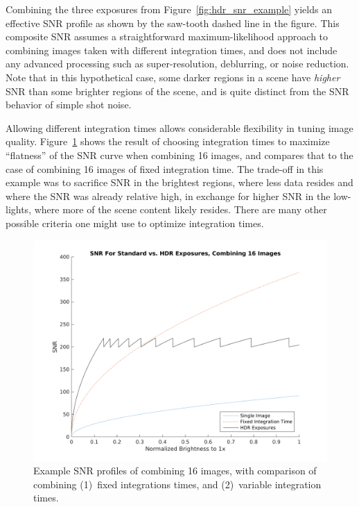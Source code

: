 \documentclass[10pt,journal]{IEEEtran}  %
\begin{document}
Combining the three exposures from Figure~\ref{fig:hdr_snr_example} yields an effective SNR profile as shown by the saw-tooth dashed line in the figure. This composite SNR assumes a straightforward maximum-likelihood approach to combining images taken with different integration times, and does not include any advanced processing such as super-resolution, deblurring, or noise reduction. Note that in this hypothetical case, some darker regions in a scene have \emph{higher} SNR than some brighter regions of the scene, and is quite distinct from the SNR behavior of simple shot noise.

Allowing different integration times allows considerable flexibility in tuning image quality.  Figure~\ref{fig:hdr_snr_flatter} shows the result of choosing integration times to maximize ``flatness'' of the SNR curve when combining 16 images, and compares that to the case of combining 16 images of fixed integration time. The trade-off in this example was to sacrifice SNR in the brightest regions, where less data resides and where the SNR was already relative high, in exchange for higher SNR in the low-lights, where more of the scene content likely resides. There are many other possible criteria one might use to optimize integration times.

\begin{figure}
  \includegraphics[width=\columnwidth]{figures/hdr-design-compare-snr.png}
  \caption{Example SNR profiles of combining 16 images, with comparison of combining (1)~fixed integrations times, and (2)~variable integration times.\label{fig:hdr_snr_flatter}}
\end{figure}
\end{document}
